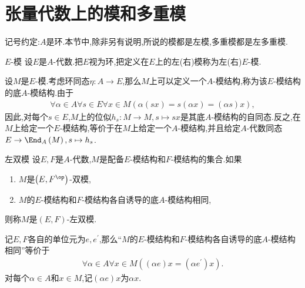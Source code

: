 \section{张量代数上的模和多重模}

记号约定:$A$是环.本节中,除非另有说明,所说的模都是左模,多重模都是左多重模.

\begin{definition}{$E$-模}{}
	设$E$是$A$-代数.把$E$视为环,把定义在$E$上的左(右)模称为左(右)$E$-模.
\end{definition}

\begin{remark}{}{}
	设$M$是$E$-模.考虑环同态$\eta:A\to E$,那么$M$上可以定义一个$A$-模结构,称为该$E$-模结构的底$A$-模结构.由于
	\begin{align*}
		\forall\alpha\in A\forall s\in E\forall x\in M\left(\alpha\left(sx\right)=s\left(\alpha x\right)=\left(\alpha s\right)x\right),
	\end{align*}
	因此,对每个$s\in E$,$M$上的位似$h_{s}:M\to M,s\mapsto sx$是其底$A$-模结构的自同态.反之,在$M$上给定一个$E$-模结构,等价于在$M$上给定一个$A$-模结构,并且给定$A$-代数同态$E\to\End_{A}\left(M\right),s\mapsto h_{s}$.
\end{remark}

\begin{definition}{左双模}{}
	设$E,F$是$A$-代数,$M$是配备$E$-模结构和$F$-模结构的集合.如果
	\begin{enumerate}
		\item $M$是$\left(E,F^{\op}\right)$-双模,
		\item $M$的$E$-模结构和$F$-模结构各自诱导的底$A$-模结构相同,
	\end{enumerate}
	则称$M$是$\left(E,F\right)$-左双模.
\end{definition}

\begin{remark}{}{}
	记$E,F$各自的单位元为$e,e^{\prime}$,那么``$M$的$E$-模结构和$F$-模结构各自诱导的底$A$-模结构相同''等价于
	\begin{align*}
		\forall\alpha\in A\forall x\in M\left(\left(\alpha e\right)x=\left(\alpha e^{\prime}\right)x\right).
	\end{align*}
	对每个$\alpha\in A$和$x\in M$,记$\left(\alpha e\right)x$为$\alpha x$.
\end{remark}

